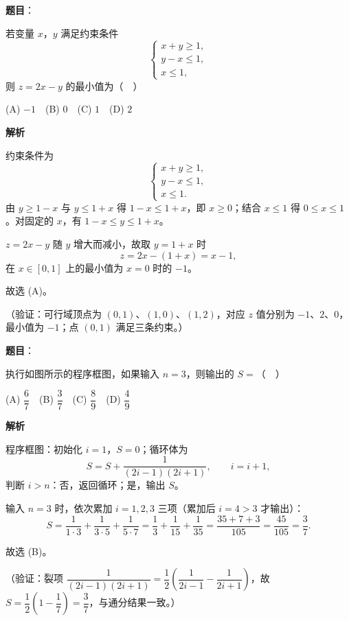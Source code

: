 \begin{answer}

\textbf{题目}：

若变量 \(x\)，\(y\) 满足约束条件
\nopagebreak[4]
\[
\begin{cases}
x+y\geqslant1,\\
y-x\leqslant1,\\
x\leqslant1,
\end{cases}
\]
则 \(z=2x-y\) 的最小值为（　）

(A) \(-1\)　(B) \(0\)　(C) \(1\)　(D) \(2\)

\textbf{解析}

约束条件为
\nopagebreak[4]
\[
\begin{cases}
x+y\geqslant1,\\
y-x\leqslant1,\\
x\leqslant1.
\end{cases}
\]
由 \(y\geqslant1-x\) 与 \(y\leqslant1+x\) 得 \(1-x\leqslant1+x\)，即 \(x\geqslant0\)；结合 \(x\leqslant1\) 得 \(0\leqslant x\leqslant1\)。对固定的 \(x\)，有 \(1-x\leqslant y\leqslant1+x\)。

\(z=2x-y\) 随 \(y\) 增大而减小，故取 \(y=1+x\) 时
\nopagebreak[4]
\[
z=2x-(1+x)=x-1,
\]
在 \(x\in[0,1]\) 上的最小值为 \(x=0\) 时的 \(-1\)。

故选 (A)。

（验证：可行域顶点为 \((0,1)\)、\((1,0)\)、\((1,2)\)，对应 \(z\) 值分别为 \(-1\)、\(2\)、\(0\)，最小值为 \(-1\)；点 \((0,1)\) 满足三条约束。）


\end{answer}
\begin{answer}

\textbf{题目}：

执行如图所示的程序框图，如果输入 \(n=3\)，则输出的 \(S=\)（　）
\nopagebreak[4]
\begin{center}\end{center}
\nopagebreak[4]
(A) \(\dfrac67\)　(B) \(\dfrac37\)　(C) \(\dfrac89\)　(D) \(\dfrac49\)\par\smallskip

\textbf{解析}

程序框图：初始化 \(i=1\)，\(S=0\)；循环体为
\nopagebreak[4]
\[
S=S+\dfrac{1}{(2i-1)(2i+1)},\qquad i=i+1,
\]
判断 \(i>n\)：否，返回循环；是，输出 \(S\)。

输入 \(n=3\) 时，依次累加 \(i=1,2,3\) 三项（累加后 \(i=4>3\) 才输出）：
\nopagebreak[4]
\[
S=\dfrac{1}{1\cdot3}+\dfrac{1}{3\cdot5}+\dfrac{1}{5\cdot7}
=\dfrac13+\dfrac1{15}+\dfrac1{35}
=\dfrac{35+7+3}{105}=\dfrac{45}{105}=\dfrac37.
\]

故选 (B)。

（验证：裂项 \(\dfrac{1}{(2i-1)(2i+1)}=\dfrac12\left(\dfrac{1}{2i-1}-\dfrac{1}{2i+1}\right)\)，故 \(S=\dfrac12\left(1-\dfrac17\right)=\dfrac37\)，与通分结果一致。）


\end{answer}
